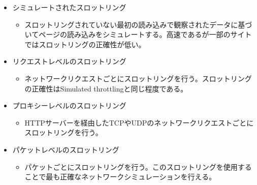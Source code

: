 \begin{itemize}
    \item シミュレートされたスロットリング
    \begin{itemize}
        \item スロットリングされていない最初の読み込みで観察されたデータに基づいてページの読み込みをシミュレートする。高速であるが一部のサイトではスロットリングの正確性が低い。
    \end{itemize}
    \item リクエストレベルのスロットリング
    \begin{itemize}
        \item ネットワークリクエストごとにスロットリングを行う。スロットリングの正確性はSimulated throttlingと同じ程度である。
    \end{itemize}
    \item プロキシーレベルのスロットリング
    \begin{itemize}
        \item HTTPサーバーを経由したTCPやUDPのネットワークリクエストごとにスロットリングを行う。
    \end{itemize}
    \item パケットレベルのスロットリング
    \begin{itemize}
        \item パケットごとにスロットリングを行う。このスロットリングを使用することで最も正確なネットワークシミュレーションを行える。
    \end{itemize}
\end{itemize}

